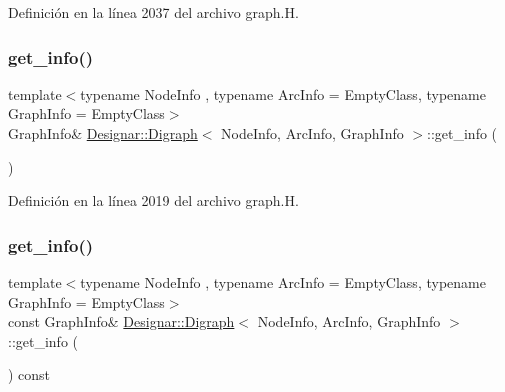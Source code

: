 Definición en la línea 2037 del archivo graph.\+H.

\mbox{\label{class_designar_1_1_digraph_a530d2befede0eede246d9eed6c05f1f6}} 
\subsubsection{\texorpdfstring{get\+\_\+info()}{get\_info()}\hspace{0.1cm}{\footnotesize\ttfamily [1/2]}}
{\footnotesize\ttfamily template$<$typename Node\+Info , typename Arc\+Info  = Empty\+Class, typename Graph\+Info  = Empty\+Class$>$ \\
Graph\+Info\& \hyperlink{class_designar_1_1_digraph}{Designar\+::\+Digraph}$<$ Node\+Info, Arc\+Info, Graph\+Info $>$\+::get\+\_\+info (\begin{DoxyParamCaption}{ }\end{DoxyParamCaption})\hspace{0.3cm}{\ttfamily [inline]}}



Definición en la línea 2019 del archivo graph.\+H.

\mbox{\label{class_designar_1_1_digraph_a113a9f5a392795312a2d0c0d5c86041c}} 
\subsubsection{\texorpdfstring{get\+\_\+info()}{get\_info()}\hspace{0.1cm}{\footnotesize\ttfamily [2/2]}}
{\footnotesize\ttfamily template$<$typename Node\+Info , typename Arc\+Info  = Empty\+Class, typename Graph\+Info  = Empty\+Class$>$ \\
const Graph\+Info\& \hyperlink{class_designar_1_1_digraph}{Designar\+::\+Digraph}$<$ Node\+Info, Arc\+Info, Graph\+Info $>$\+::get\+\_\+info (\begin{DoxyParamCaption}{ }\end{DoxyParamCaption}) const\hspace{0.3cm}{\ttfamily [inline]}}



